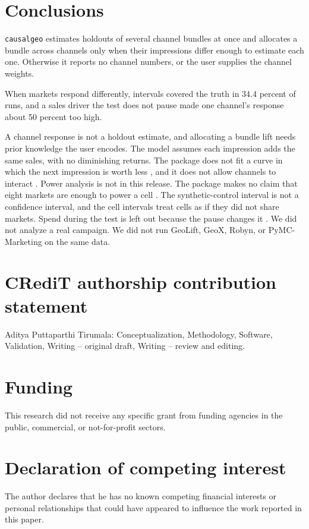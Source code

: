 \documentclass[preprint,12pt]{elsarticle}
\begin{document}
\section{Conclusions}
\label{sec:conclusions}

\texttt{causalgeo} estimates holdouts of several channel bundles at once and allocates a bundle across channels only when their impressions differ enough to estimate each one. Otherwise it reports no channel numbers, or the user supplies the channel weights.

When markets respond differently, intervals covered the truth in 34.4 percent of runs, and a sales driver the test does not pause made one channel's response about 50 percent too high.

A channel response is not a holdout estimate, and allocating a bundle lift needs prior knowledge the user encodes. The model assumes each impression adds the same sales, with no diminishing returns. The package does not fit a curve in which the next impression is worth less \cite{jin2017}, and it does not allow channels to interact \cite{naik2003}. Power analysis is not in this release. The package makes no claim that eight markets are enough to power a cell \cite{lewisrao2015}. The synthetic-control interval is not a confidence interval, and the cell intervals treat cells as if they did not share markets. Spend during the test is left out because the pause changes it \cite{angrist2009,lewis2011}. We did not analyze a real campaign. We did not run GeoLift, GeoX, Robyn, or PyMC-Marketing on the same data.

\section*{CRediT authorship contribution statement}
Aditya Puttaparthi Tirumala: Conceptualization, Methodology, Software, Validation, Writing -- original draft, Writing -- review and editing.

\section*{Funding}
This research did not receive any specific grant from funding agencies in the public, commercial, or not-for-profit sectors.

\section*{Declaration of competing interest}
The author declares that he has no known competing financial interests or personal relationships that could have appeared to influence the work reported in this paper.
\end{document}
